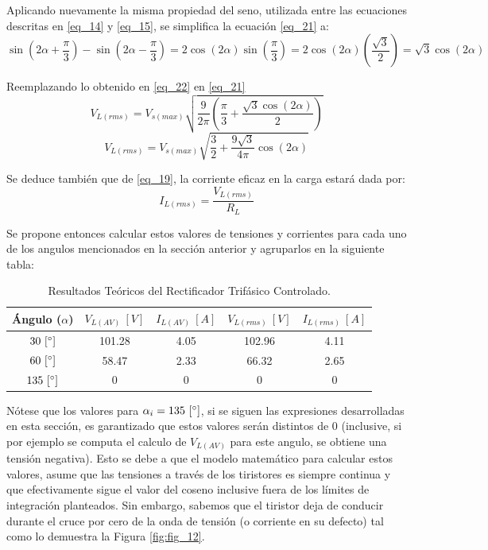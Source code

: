 \documentclass[12pt,a4paper]{article}
\begin{document}
Aplicando nuevamente la misma propiedad del seno, utilizada entre las ecuaciones descritas en \eqref{eq_14} y \eqref{eq_15}, se simplifica la ecuación \eqref{eq_21} a:
\begin{equation}
    \sin\left(2\alpha + \frac{\pi}{3}\right) - \sin\left(2\alpha - \frac{\pi}{3}\right) = 2 \cos(2\alpha) \sin\left(\frac{\pi}{3}\right) = 2 \cos(2\alpha) \left(\frac{\sqrt{3}}{2}\right) = \sqrt{3}\cos(2\alpha)
    \label{eq_23}
\end{equation}

Reemplazando lo obtenido en \eqref{eq_22} en \eqref{eq_21}
\begin{equation}
    V_{L(rms)} = V_{s(max)} \sqrt{\frac{9}{2\pi} \left(\frac{\pi}{3} + \frac{\sqrt{3}\cos(2\alpha)}{2} \right)}
    \label{eq_24}
\end{equation}
\begin{equation}
    V_{L(rms)} = V_{s(max)} \sqrt{\frac{3}{2} + \frac{9\sqrt{3}}{4\pi} \cos(2\alpha)}
    \label{eq_25}
\end{equation}

Se deduce también que de \eqref{eq_19}, la corriente eficaz en la carga estará dada por:
\begin{equation}
    I_{L(rms)} = \frac{V_{L(rms)}}{R_{L}}
    \label{eq_26}
\end{equation}

Se propone entonces calcular estos valores de tensiones y corrientes para cada uno de los angulos mencionados en la sección anterior y agruparlos en la siguiente tabla:
\begin{table}[H]
    \centering
    \begin{tabular}{|c|c|c|c|c|} \hline
        \textbf{Ángulo ($\alpha$)} & $V_{L(AV)} \ [V]$ & $I_{L(AV)} \ [A]$ & $V_{L(rms)} \ [V]$ & $I_{L(rms)} \ [A]$ \\ \hline
            $30 \ [\degree]$  & 101.28 & 4.05 & 102.96 & 4.11 \\ \hline
            $60 \ [\degree]$  & 58.47  & 2.33 & 66.32  & 2.65 \\ \hline
            $135 \ [\degree]$ & 0      & 0    & 0      & 0    \\ \hline
    \end{tabular}
    \caption{Resultados Teóricos del Rectificador Trifásico Controlado.}
    \label{tab:tab_1}
\end{table}

Nótese que los valores para $\alpha_{i} = 135 \ [\degree]$, si se siguen las expresiones desarrolladas en esta sección, es garantizado que estos valores serán distintos de $0$ (inclusive, si por ejemplo se computa el calculo de $V_{L(AV)}$ para este angulo, se obtiene una tensión negativa). Esto se debe a que el modelo matemático para calcular estos valores, asume que las tensiones a través de los tiristores es siempre continua y que efectivamente sigue el valor del coseno inclusive fuera de los límites de integración planteados. Sin embargo, sabemos que el tiristor deja de conducir durante el cruce por cero de la onda de tensión (o corriente en su defecto) tal como lo demuestra la Figura \eqref{fig:fig_12}.
\end{document}

